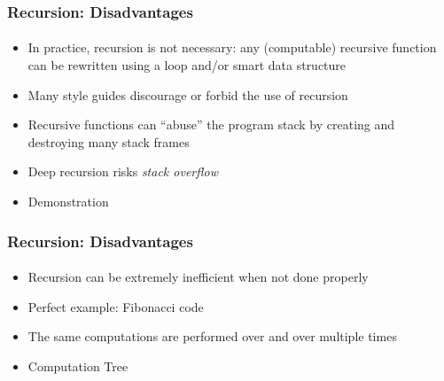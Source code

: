 \documentclass[]{beamer}
\begin{document}
\begin{frame}[fragile]
  \frametitle{Recursion: Disadvantages}
  \framesubtitle{}
    
\begin{itemize}[<+->]
  \item In practice, recursion is not necessary: any (computable)
    recursive function can be rewritten using a loop and/or smart data structure
  \item Many style guides discourage or forbid the use of recursion
  \item Recursive functions can ``abuse'' the program stack by creating 
  and destroying many stack frames
  \item Deep recursion risks \emph{stack overflow}%
  \item Demonstration
\end{itemize} 

\end{frame}


\begin{frame}[fragile]
  \frametitle{Recursion: Disadvantages}
  \framesubtitle{}
    
\begin{itemize}[<+->]
  \item Recursion can be extremely inefficient when not done properly
  \item Perfect example: Fibonacci code
  \item The same computations are performed over and over multiple times
  \item Computation Tree
\end{itemize} 

\end{frame}
\end{document}

